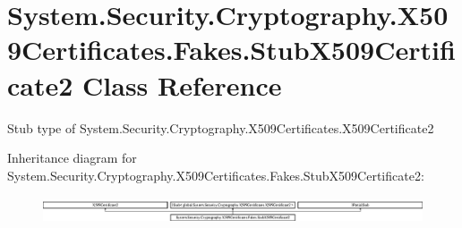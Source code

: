 \hypertarget{class_system_1_1_security_1_1_cryptography_1_1_x509_certificates_1_1_fakes_1_1_stub_x509_certificate2}{\section{System.\-Security.\-Cryptography.\-X509\-Certificates.\-Fakes.\-Stub\-X509\-Certificate2 Class Reference}
\label{class_system_1_1_security_1_1_cryptography_1_1_x509_certificates_1_1_fakes_1_1_stub_x509_certificate2}
}


Stub type of System.\-Security.\-Cryptography.\-X509\-Certificates.\-X509\-Certificate2 


Inheritance diagram for System.\-Security.\-Cryptography.\-X509\-Certificates.\-Fakes.\-Stub\-X509\-Certificate2\-:\begin{figure}[H]
\begin{center}
\leavevmode
\includegraphics[height=0.777778cm]{class_system_1_1_security_1_1_cryptography_1_1_x509_certificates_1_1_fakes_1_1_stub_x509_certificate2}
\end{center}
\end{figure}

